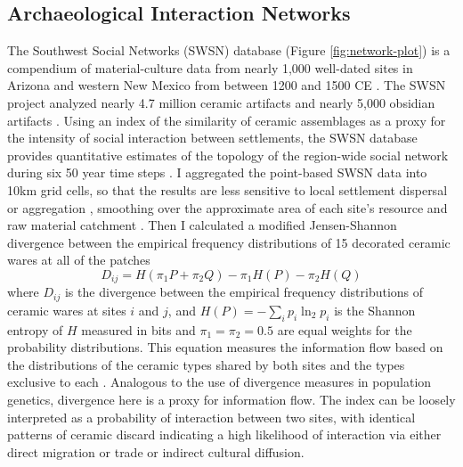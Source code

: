 \documentclass[10pt]{iopart}
\begin{document}
\subsection*{Archaeological Interaction Networks}
The Southwest Social Networks (SWSN) database (Figure \ref{fig:network-plot}) is a compendium of material-culture data from nearly 1,000 well-dated sites in Arizona and western New Mexico from between 1200 and 1500 CE \parencite{Mills2012,Mills2013a,Peeples2013,Borck2015,Hill2015,Mills2015a}. The SWSN project analyzed nearly 4.7 million ceramic artifacts and nearly 5,000 obsidian artifacts \parencite{Mills2015a}. Using an index of the similarity of ceramic assemblages as a proxy for the intensity of social interaction between settlements, the SWSN database provides quantitative estimates of the topology of the region-wide social network during six 50 year time steps \parencite{Mills2013a}. I aggregated the point-based SWSN data into 10km grid cells, so that the results are less sensitive to local settlement dispersal or aggregation \parencite{Paliou2016}, smoothing over the approximate area of each site's resource and raw material catchment \parencite{Varien1999}. Then I calculated a modified Jensen-Shannon divergence between the empirical frequency distributions of 15 decorated ceramic wares at all of the patches
\begin{equation}
    D_{ij} = H\left(\pi_1P + \pi_2Q\right) - \pi_1H(P) - \pi_2H(Q)
\end{equation}
where $D_{ij}$ is the divergence between the empirical frequency distributions of ceramic wares at sites $i$ and $j$, and $H(P) = -\sum_i p_i \ln_2 p_i$ is the Shannon entropy of $H$ measured in bits and $\pi_1 = \pi_2 = 0.5$ are equal weights for the probability distributions. This equation measures the information flow based on the distributions of the ceramic types shared by both sites and the types exclusive to each \parencite{Masucci2011}. Analogous to the use of divergence measures in population genetics, divergence here is a proxy for information flow. The index can be loosely interpreted as a probability of interaction between two sites, with identical patterns of ceramic discard indicating a high likelihood of interaction via either direct migration or trade or indirect cultural diffusion.
\end{document}
